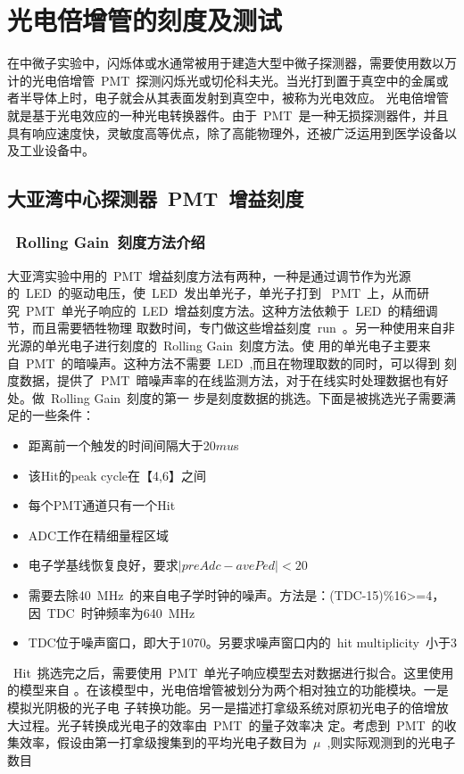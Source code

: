 
\chapter{光电倍增管的刻度及测试}
\label{chap:chap3}
在中微子实验中，闪烁体或水通常被用于建造大型中微子探测器，需要使用数以万计的光电倍增管~PMT~探测闪烁光或切伦科夫光。当光打到置于真空中的金属或者半导体上时，电子就会从其表面发射到真空中，被称为光电效应。%
光电倍增管就是基于光电效应的一种光电转换器件。由于~PMT~是一种无损探测器件，并且具有响应速度快，灵敏度高等优点，除了高能物理外，还被广泛运用到医学设备以及工业设备中。
\section{大亚湾中心探测器~PMT~增益刻度}
\subsection{~Rolling Gain~刻度方法介绍}
大亚湾实验中用的~PMT~增益刻度方法有两种，一种是通过调节作为光源的~LED~的驱动电压，使~LED~发出单光子，单光子打到
~PMT~上，从而研究~PMT~单光子响应的~LED~增益刻度方法。这种方法依赖于~LED~的精细调节，而且需要牺牲物理
取数时间，专门做这些增益刻度~run~。另一种使用来自非光源的单光电子进行刻度的~Rolling Gain~刻度方法。使
用的单光电子主要来自~PMT~的暗噪声。这种方法不需要~LED~,而且在物理取数的同时，可以得到
刻度数据，提供了~PMT~暗噪声率的在线监测方法，对于在线实时处理数据也有好处。做~Rolling Gain~刻度的第一
步是刻度数据的挑选。下面是被挑选光子需要满足的一些条件：
\begin{itemize}
\item 距离前一个触发的时间间隔大于20$mu$s
\item 该Hit的peak cycle在【4,6】之间
\item 每个PMT通道只有一个Hit
\item ADC工作在精细量程区域
\item 电子学基线恢复良好，要求$ |preAdc-avePed| <20 $
\item 需要去除40~MHz~的来自电子学时钟的噪声。方法是：(TDC-15)\%16>=4，因~TDC~时钟频率为640~MHz~
\item TDC位于噪声窗口，即大于1070。另要求噪声窗口内的~hit multiplicity~小于3
\end{itemize}
~Hit~挑选完之后，需要使用~PMT~单光子响应模型去对数据进行拟合。这里使用的模型来自
\citep{bellamy1994absolute}。在该模型中，光电倍增管被划分为两个相对独立的功能模块。一是模拟光阴极的光子电
子转换功能。另一是描述打拿级系统对原初光电子的倍增放大过程。光子转换成光电子的效率由~PMT~的量子效率决
 定。考虑到~PMT~的收集效率，假设由第一打拿级搜集到的平均光电子数目为~$\mu$~,则实际观测到的光电子数目
